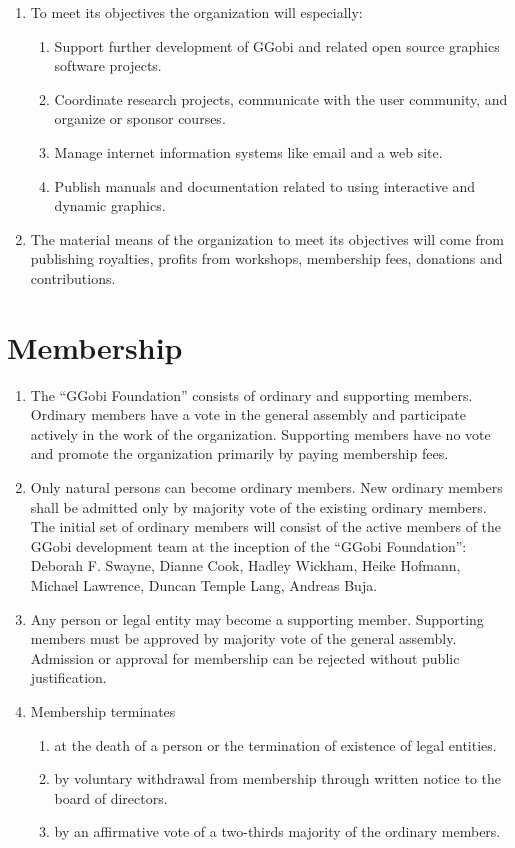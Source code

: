 \documentclass{article}
\begin{document}
\begin{enumerate} \itemsep 0in
\item To meet its objectives the organization will especially:
\begin{enumerate}
\item Support further development of GGobi and related open source graphics 
software projects.
\item Coordinate research projects, communicate with the user community,
and organize or sponsor courses.
\item Manage internet information systems like email and a web site.
\item Publish manuals and documentation related to using interactive and 
dynamic graphics.
\end{enumerate}
\item The material means of the organization to meet its objectives will come
from publishing royalties, profits from workshops, membership fees,
donations and contributions.
\end{enumerate}

\section{Membership}

\begin{enumerate} \itemsep 0in
\item The ``GGobi Foundation'' consists of ordinary and supporting
members.  Ordinary members have a vote in the general assembly and
participate actively in the work of the organization.  Supporting
members have no vote and promote the organization primarily by
paying membership fees.
\item Only natural persons can become ordinary members.  New ordinary
members shall be admitted only by majority vote of the existing
ordinary members.  The initial set of ordinary members will consist of
the active members of the GGobi development team at the inception of
the ``GGobi Foundation'': Deborah F. Swayne, Dianne Cook, Hadley
Wickham, Heike Hofmann, Michael Lawrence, Duncan Temple Lang, Andreas
Buja.
\item Any person or legal entity may become a supporting
member. Supporting members must be approved by majority vote of the
general assembly. Admission or approval for membership can be rejected
without public justification.
\item Membership terminates 
\begin{enumerate} \itemsep 0in
\item at the death of a person or the termination of existence of
legal entities.
\item by voluntary withdrawal from membership through written notice
to the board of directors.
\item by an affirmative vote of a two-thirds majority of the ordinary
members.
\end{enumerate}
\end{enumerate}
\end{document}

